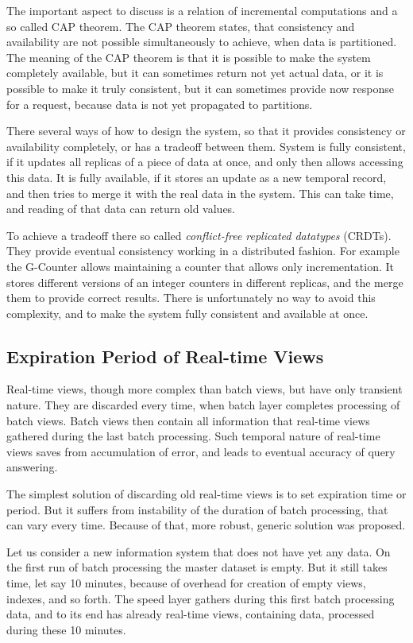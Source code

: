 The important aspect to discuss is a relation of incremental computations and a so called CAP theorem.
The CAP theorem states, that consistency and availability are not possible simultaneously to achieve, when data is partitioned.
The meaning of the CAP theorem is that it is possible to make the system completely available, but it can sometimes return not yet actual data, or it is possible to make it truly consistent, but it can sometimes provide now response for a request, because data is not yet propagated to partitions.

There several ways of how to design the system, so that it provides consistency or availability completely, or has a tradeoff between them.
System is fully consistent, if it updates all replicas of a piece of data at once, and only then allows accessing this data.
It is fully available, if it stores an update as a new temporal record, and then tries to merge it with the real data in the system.
This can take time, and reading of that data can return old values.

To achieve a tradeoff there so called \textit{conflict-free replicated datatypes} (CRDTs).
They provide eventual consistency working in a distributed fashion.
For example the G-Counter allows maintaining a counter that allows only incrementation.
It stores different versions of an integer counters in different replicas, and the merge them to provide correct results.
There is unfortunately no way to avoid this complexity, and to make the system fully consistent and available at once.

\subsection{Expiration Period of Real-time Views}

Real-time views, though more complex than batch views, but have only transient nature.
They are discarded every time, when batch layer completes processing of batch views.
Batch views then contain all information that real-time views gathered during the last batch processing. 
Such temporal nature of real-time views saves from accumulation of error, and leads to eventual accuracy of query answering.

The simplest solution of discarding old real-time views is to set expiration time or period.
But it suffers from instability of the duration of batch processing, that can vary every time.
Because of that, more robust, generic solution was proposed.

Let us consider a new information system that does not have yet any data.
On the first run of batch processing the master dataset is empty.
But it still takes time, let say 10 minutes, because of overhead for creation of empty views, indexes, and so forth.
The speed layer gathers during this first batch processing data, and to its end has already real-time views, containing data, processed during these 10 minutes.

